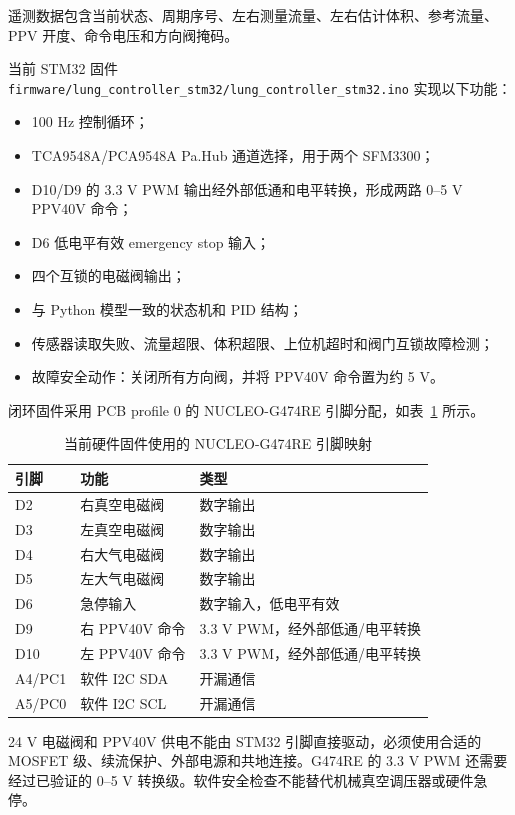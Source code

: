 \documentclass[UTF8,11pt,a4paper]{ctexart}
\begin{document}
遥测数据包含当前状态、周期序号、左右测量流量、左右估计体积、参考流量、PPV 开度、命令电压和方向阀掩码。

当前 STM32 固件 \texttt{firmware/lung\_controller\_stm32/lung\_controller\_stm32.ino} 实现以下功能：
\begin{itemize}
  \item 100 Hz 控制循环；
  \item TCA9548A/PCA9548A Pa.Hub 通道选择，用于两个 SFM3300；
  \item D10/D9 的 3.3 V PWM 输出经外部低通和电平转换，形成两路 0--5 V PPV40V 命令；
  \item D6 低电平有效 emergency stop 输入；
  \item 四个互锁的电磁阀输出；
  \item 与 Python 模型一致的状态机和 PID 结构；
  \item 传感器读取失败、流量超限、体积超限、上位机超时和阀门互锁故障检测；
  \item 故障安全动作：关闭所有方向阀，并将 PPV40V 命令置为约 5 V。
\end{itemize}

闭环固件采用 PCB profile 0 的 NUCLEO-G474RE 引脚分配，如表~\ref{tab:pin-map} 所示。

\begin{table}[H]
\centering
\caption{当前硬件固件使用的 NUCLEO-G474RE 引脚映射}
\label{tab:pin-map}
\small
\begin{tabular}{lll}
\toprule
\textbf{引脚} & \textbf{功能} & \textbf{类型} \\
\midrule
D2 & 右真空电磁阀 & 数字输出 \\
D3 & 左真空电磁阀 & 数字输出 \\
D4 & 右大气电磁阀 & 数字输出 \\
D5 & 左大气电磁阀 & 数字输出 \\
D6 & 急停输入 & 数字输入，低电平有效 \\
D9 & 右 PPV40V 命令 & 3.3 V PWM，经外部低通/电平转换 \\
D10 & 左 PPV40V 命令 & 3.3 V PWM，经外部低通/电平转换 \\
A4/PC1 & 软件 I2C SDA & 开漏通信 \\
A5/PC0 & 软件 I2C SCL & 开漏通信 \\
\bottomrule
\end{tabular}
\end{table}

24 V 电磁阀和 PPV40V 供电不能由 STM32 引脚直接驱动，必须使用合适的 MOSFET 级、续流保护、外部电源和共地连接。G474RE 的 3.3 V PWM 还需要经过已验证的 0--5 V 转换级。软件安全检查不能替代机械真空调压器或硬件急停。
\end{document}
